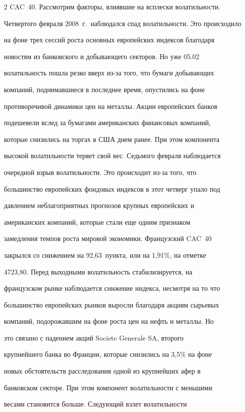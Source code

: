 \begin{multicols}{2}
{CAC~40}. Рассмотрим факторы, влиявшие на всплески волатильности.


Четвертого февраля 2008~г.\ наблюдался спад волатильности. Это происходило


на фоне трех сессий роста основных европейских индексов благодаря


новостям из банковского и добывающего секторов. Но уже 05.02


волатильность пошла резко вверх из-за того, что бумаги добывающих


компаний, поднимавшиеся в последнее время, опустились на фоне


противоречивой динамики цен на металлы. Акции европейских банков


подешевели вслед за бумагами американских финансовых компаний,


которые снизились на торгах в США днем ранее. При этом компонента


высокой волатильности теряет свой вес. Седьмого февраля наблюдается


очередной взрыв волатильности. Это происходит из-за того, что


большинство европейских фондовых индексов в этот четверг упало под


давлением неблагоприятных прогнозов крупных европейских и


американских компаний, которые стали еще одним признаком


замедления темпов роста мировой экономики. Французский CAC~40


закрылся со снижением на 92,63~пункта, или на 1,91\%, на отметке


4723,80. Перед выходными волатильность стабилизируется, на


французском рынке наблюдается снижение индекса, несмотря на то что


большинство европейских рынков вы\-рос\-ли благодаря акциям сырьевых


компаний, подорожавшим на фоне роста цен на нефть и металлы. Но


это связано с падением акций Societe Generale SA, второго


крупнейшего банка во Франции, которые снизились на 3,5\% на фоне


новых обстоятельств расследования одной из крупнейших афер в


банковском секторе. При этом компонент волатильности с меньшими


весами становится больше. Сле\-ду\-ющий взлет волатильности



\end{multicols}
